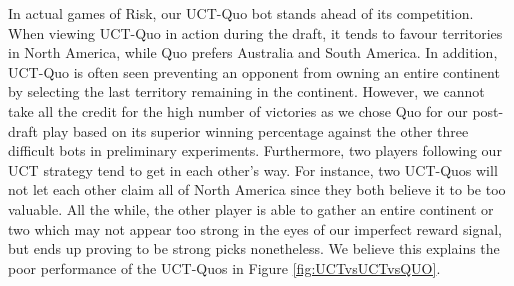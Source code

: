 \documentclass[letterpaper]{article}
\numberwithin{equation}{section}
\numberwithin{theorem}{section}
\numberwithin{lemma}{section}
\numberwithin{df}{section}
\begin{document}
In actual games of Risk, our UCT-Quo bot stands ahead of its competition.  When viewing UCT-Quo in action during the draft, it tends to favour territories in North America, while Quo prefers Australia and South America.  In addition, UCT-Quo is often seen preventing an opponent from owning an entire continent by selecting the last territory remaining in the continent.  However, we cannot take all the credit for the high number of victories as we chose Quo for our post-draft play based on its superior winning percentage against the other three difficult bots in preliminary experiments.  Furthermore, two players following our UCT strategy tend to get in each other's way.  For instance, two UCT-Quos will not let each other claim all of North America since they both believe it to be too valuable.  All the while, the other player is able to gather an entire continent or two which may not appear too strong in the eyes of our imperfect reward signal, but ends up proving to be strong picks nonetheless.  We believe this explains the poor performance of the UCT-Quos in Figure \ref{fig:UCTvsUCTvsQUO}.
\end{document}

